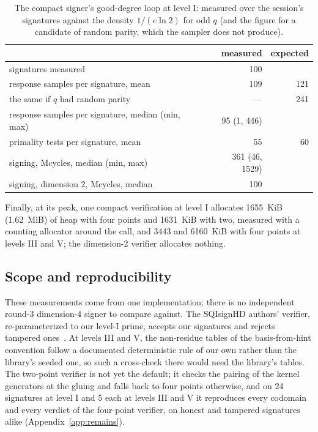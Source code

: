 \documentclass[version=preprint]{iacrcc}
\begin{document}
    \begin{table}[t]
        \centering
        \caption{The compact signer's good-degree loop at level I: measured over
            the session's signatures against the density $1/(e \ln 2)$ for odd $q$
            (and the figure for a candidate of random parity, which the sampler does
            not produce).}
        \label{tab:loop}
        \begin{tabular}{l r r}
            \toprule
            & measured & expected \\
            \midrule
            signatures measured & 100 & \\
            response samples per signature, mean & 109 & 121 \\
            the same if $q$ had random parity & --- & 241 \\
            response samples per signature, median (min, max) & 95 (1, 446) & \\
            primality tests per signature, mean & 55 & 60 \\
            signing, Mcycles, median (min, max) & 361 (46, 1529) & \\
            signing, dimension 2, Mcycles, median & 100 & \\
            \bottomrule
        \end{tabular}
    \end{table}

    Finally, at its peak, one compact verification at level I allocates
    1655~KiB (1.62~MiB) of heap with four points and 1631~KiB with two,
    measured with a counting allocator around the call, and 3443 and 6160~KiB
    with four points at levels III and V; the dimension-2 verifier allocates
    nothing.

    \subsection{Scope and reproducibility}
    \label{sec:scope}
    These measurements come from one implementation; there is no independent
    round-3 dimension-4 signer to compare against. The SQIsignHD authors'
    verifier, re-parameterized to our level-I prime, accepts our signatures and
    rejects tampered ones~\cite{DLRW25}. At levels III and V, the non-residue
    tables of the basis-from-hint convention follow a documented deterministic
    rule of our own rather than the library's seeded one, so such a cross-check
    there would need the library's tables.   The
    two-point verifier is not yet the default; it checks the pairing of the
    kernel generators at the gluing and falls back to four points otherwise, and
    on 24 signatures at level I and 5 each at levels III and V it reproduces
    every codomain and every verdict of the four-point verifier, on honest and
    tampered signatures alike (Appendix~\ref{app:remains}).
\end{document}
